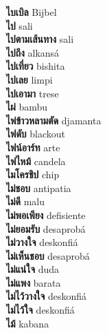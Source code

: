 \textbf{ ไบเบิล  } Bijbel \\
\textbf{ ไป  } sali \\
\textbf{ ไปตามเส้นทาง  } sali \\
\textbf{ ไปถึง  } alkansá \\
\textbf{ ไปเที่ยว  } bishita \\
\textbf{ ไปเลย  } limpi \\
\textbf{ ไปเอามา  } trese \\
\textbf{ ไผ่  } bambu \\
\textbf{ ไพ่ข้าวหลามตัด  } djamanta \\
\textbf{ ไฟดับ  } blackout \\
\textbf{ ไฟน์อาร์ท  } arte \\
\textbf{ ไฟไหม้  } candela \\
\textbf{ ไมโครชิป  } chip \\
\textbf{ ไม่ชอบ  } antipatia \\
\textbf{ ไม่ดี  } malu \\
\textbf{ ไม่พอเพียง  } defisiente \\
\textbf{ ไม่ยอมรับ  } desaprobá \\
\textbf{ ไม่วางใจ  } deskonfiá \\
\textbf{ ไม่เห็นชอบ  } desaprobá \\
\textbf{ ไม่แน่ใจ  } duda \\
\textbf{ ไม่แพง  } barata \\
\textbf{ ไม่ไว้วางใจ  } deskonfiá \\
\textbf{ ไม่ไว้ใจ  } deskonfiá \\
\textbf{ ไม้  } kabana \\
